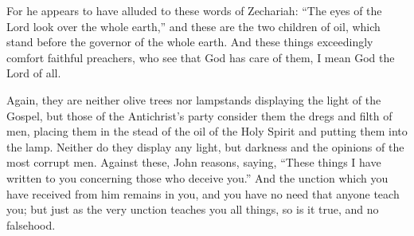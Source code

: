 For he appears to have alluded to these words of Zechariah: “The eyes of the Lord look over the whole earth,” and these are the two children of oil, which stand before the governor of the whole earth. And these things exceedingly comfort faithful preachers, who see that God has care of them, I mean God the Lord of all.

Again, they are neither olive trees nor lampstands displaying the light of the Gospel, but those of the Antichrist’s party consider them the dregs and filth of men, placing them in the stead of the oil of the Holy Spirit and putting them into the lamp. Neither do they display any light, but darkness and the opinions of the most corrupt men. Against these, John reasons, saying, “These things I have written to you concerning those who deceive you.” And the unction which you have received from him remains in you, and you have no need that anyone teach you; but just as the very unction teaches you all things, so is it true, and no falsehood.

